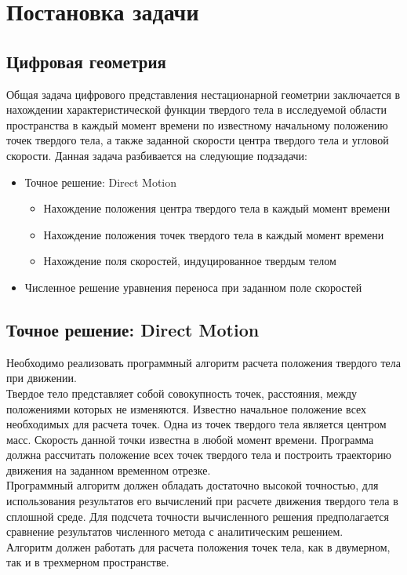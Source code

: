 \documentclass[12pt,a4paper]{article}
\begin{document}
\section{Постановка задачи}

\subsection{Цифровая геометрия}
Общая задача цифрового представления нестационарной геометрии заключается в нахождении характеристической функции твердого тела в исследуемой области пространства в каждый момент времени по известному начальному положению точек твердого тела, а также заданной скорости центра твердого тела и угловой скорости.
Данная задача разбивается на следующие подзадачи:
\begin{itemize}
  \item {Точное решение: Direct Motion}
  	\begin{itemize}
  		\item {Нахождение положения центра твердого тела в каждый момент времени}
  		\item {Нахождение положения точек твердого тела в каждый момент времени}
  		\item {Нахождение поля скоростей, индуцированное твердым телом}
  	\end{itemize}
  \item {Численное решение уравнения переноса при заданном поле скоростей}
\end{itemize}


\subsection{Точное решение: Direct Motion}
Необходимо реализовать программный алгоритм расчета положения твердого тела при движении.\\
Твердое тело представляет собой совокупность точек, расстояния, между положениями которых не изменяются. Известно начальное положение всех необходимых для расчета точек. Одна из точек твердого тела является центром масс. Скорость данной точки известна в любой момент времени. Программа должна рассчитать положение всех точек твердого тела и построить траекторию движения на заданном временном отрезке.\\
Программный алгоритм должен обладать достаточно высокой точностью, для использования результатов его вычислений при расчете движения твердого тела в сплошной среде. Для подсчета точности вычисленного решения предполагается сравнение результатов численного метода с аналитическим решением.\\
Алгоритм должен работать для расчета положения точек тела, как в двумерном, так и в трехмерном пространстве.
\end{document}
